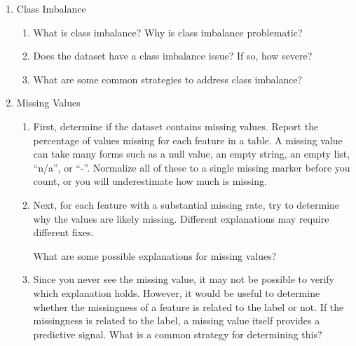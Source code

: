\documentclass[12pt]{article}
\begin{document}
\begin{enumerate}
\begin{enumerate}
\item What should we do when exploring the distributions of the features?

\item Suppose a feature takes the same value for almost every respondent. Why is this feature worth finding, and what would you do about it?

 \item Suppose two features are highly correlated, such as two Likert questions that respondents tend to answer the same way. How would you test whether two features are highly correlated, and why does a highly correlated pair cause trouble?

\end{enumerate}

\item Class Imbalance

\begin{enumerate}

\item What is class imbalance? Why is class imbalance problematic? 

\item Does the dataset have a class imbalance issue? If so, how severe?

\item What are some common strategies to address class imbalance? 

\end{enumerate}

\item Missing Values

\begin{enumerate}
 
\item First, determine if the dataset contains missing values. Report the percentage of values missing for each feature in a table. A missing value can take many forms such as a null value, an empty string, an empty list, ``n/a'', or ``-''. Normalize all of these to a single missing marker before you count, or you will underestimate how much is missing.
\bigskip

\item Next, for each feature with a substantial missing rate, try to determine why the values are likely missing. Different explanations may require different fixes. 

What are some possible explanations for missing values?

\bigskip

\item
Since you never see the missing value, it may not be possible to verify which explanation holds. However, it would be useful to determine whether the missingness of a feature is related to the label or not. If the missingness is related to the label, a missing value itself provides a predictive signal. What is a common strategy for determining this? 


\end{enumerate}
\end{enumerate}
\end{document}
